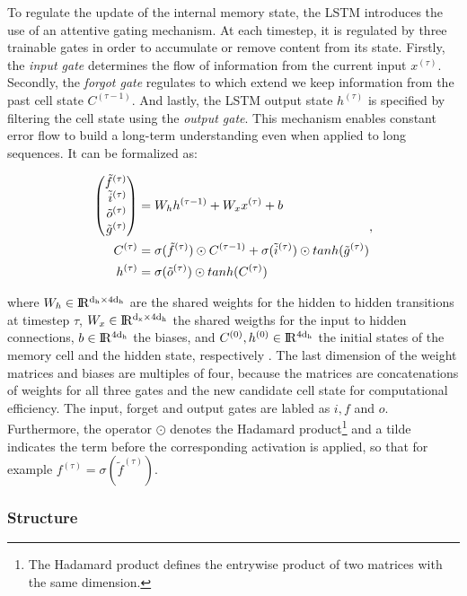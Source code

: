 To regulate the update of the internal memory state, the LSTM introduces the use of an attentive gating mechanism. At each timestep, it is regulated by three trainable gates in order to accumulate or remove content from its state. Firstly, the \textit{input gate} determines the flow of information from the current input $ x^{(\tau)} $. Secondly, the \textit{forgot gate} regulates to which extend we keep information from the past cell state $C^{(\tau-1)}$. And lastly, the LSTM output state $h^{(\tau)}$ is specified by filtering the cell state using the \textit{output gate}. This mechanism enables constant error flow to build a long-term understanding even when applied to long sequences. It can be formalized as:

\begin{equation} \label{eq:lstm}
\begin{aligned}
\Spvek{\tilde{f}^{(\tau)}; \tilde{i}^{(\tau)}; \tilde{o}^{(\tau)}; \tilde{g}^{(\tau)}} &= W_{h} h^{(\tau-1)} + W_{x} x^{(\tau)} + b \\
C^{(\tau)} &= \sigma(\tilde{f}^{(\tau)}) \odot C^{(\tau-1)} + \sigma(\tilde{i}^{(\tau)}) \odot tanh(\tilde{g}^{(\tau)}) \\
h^{(\tau)} &= \sigma(\tilde{o}^{(\tau)}) \odot tanh(C^{(\tau)})
\end{aligned} ,
\end{equation}

where $ W_h \in \rm I\!R^{d_h \times 4d_h} $ are the shared weights for the hidden to hidden transitions at timestep $ \tau $, $ W_x \in \rm I\!R^{d_x \times 4d_h} $ the shared weigths for the input to hidden connections, $ b \in \rm I\!R^{4d_h} $ the biases, and $ C^{(0)}, h^{(0)} \in \rm I\!R^{4d_h} $ the initial states of the memory cell and the hidden state, respectively \parencite{rnn-batchnorm}. The last dimension of the weight matrices and biases are multiples of four, because the matrices are concatenations of weights for all three gates and the new candidate cell state for computational efficiency. The input, forget and output gates are labled as $ i, f $ and $ o $. Furthermore, the operator $ \odot $ denotes the Hadamard product\footnote{The Hadamard product defines the entrywise product of two matrices with the same dimension.} and a tilde indicates the term before the corresponding activation is applied, so that for example $ f^{(\tau)} = \sigma(\tilde{f}^{(\tau)}) $.


\subsubsection{Structure}


